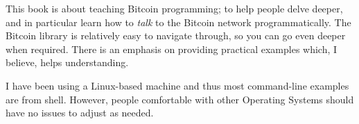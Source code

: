 This book is about teaching Bitcoin programming; to help people delve deeper, and in particular learn how to \emph{talk} to the Bitcoin network programmatically. The Bitcoin library is relatively easy to navigate through, so you can go even deeper when required. There is an emphasis on providing practical examples which, I believe, helps understanding.

I have been using a Linux-based machine and thus most command-line examples are from  shell. However, people comfortable with other Operating Systems should have no issues to adjust as needed.
